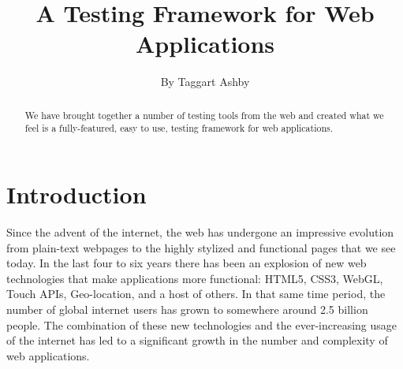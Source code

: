 \documentclass[11pt]{article}
\begin{document}

\title{\vfill A Testing Framework for Web Applications} %
\author{
By Taggart Ashby \vspace{10pt} \\
}

\maketitle

\vfill  %

\begin{abstract}
We have brought together a number of testing tools from the web and created what we feel is a fully-featured, easy to use, testing framework for web applications.
\end{abstract}

\thispagestyle{empty} %
\newpage


\setcounter{page}{1}

\section{Introduction}
Since the advent of the internet, the web has undergone an impressive evolution from plain-text webpages to the highly stylized and functional pages that we see today. In the last four to six years there has been an explosion of new web technologies that make applications more functional: HTML5, CSS3, WebGL, Touch APIs, Geo-location, and a host of others. \cite{EvolutionOfWeb} In that same time period, the number of global internet users has grown to somewhere around 2.5 billion people. \cite{EvolutionOfWeb} The combination of these new technologies and the ever-increasing usage of the internet has led to a significant growth in the number and complexity of web applications.
\end{document}
